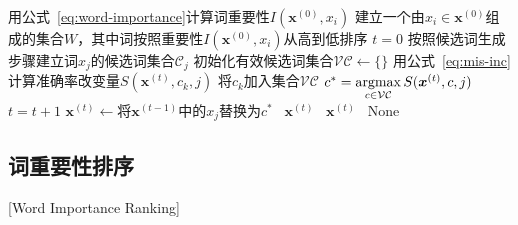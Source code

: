 \begin{algorithm}[!h]
    \wuhao
	\LinesNumbered %
		{
		    用公式~\ref{eq:word-importance}计算词重要性$I(\bm{x}^{(0)},x_i)$\;
		}
		建立一个由$x_i\in\bm{x}^{(0)}$组成的集合$W$，其中词按照重要性$I(\bm{x}^{(0)},x_i)$从高到低排序\;
		$t=0$\;
		{
		    按照候选词生成步骤建立词$x_j$的候选词集合$\mathcal{C}_j$\;
		    初始化有效候选词集合$\mathcal{VC} \leftarrow \{\}$\;
		    {
		        用公式~\ref{eq:mis-inc}计算准确率改变量$S(\bm{x}^{(t)},c_k,j)$\;
		        {
		            将$c_k$加入集合$\mathcal{VC}$
		        }
		    }
		}
		{
		    $c^* = \operatorname*{argmax}\limits_{c \in \mathcal{VC}} S(\bm{x}^{(t)},c,j)$\;
    		$t = t + 1$\;
    		$\bm{x}^{(t)} \leftarrow \text{将} \bm{x}^{(t-1)} \text{中的} x_j  \text{替换为} c^*$\;
    		{
    		    \algorithmicreturn\ $\bm{x}^{(t)}$
    		}
		}
		{
		    \algorithmicreturn\ $\bm{x}^{(t)}$
		}
		{
		    \algorithmicreturn\ None
		}
	\label{algo:attack}
\end{algorithm}


\subsection{词重要性排序}[Word Importance Ranking]

